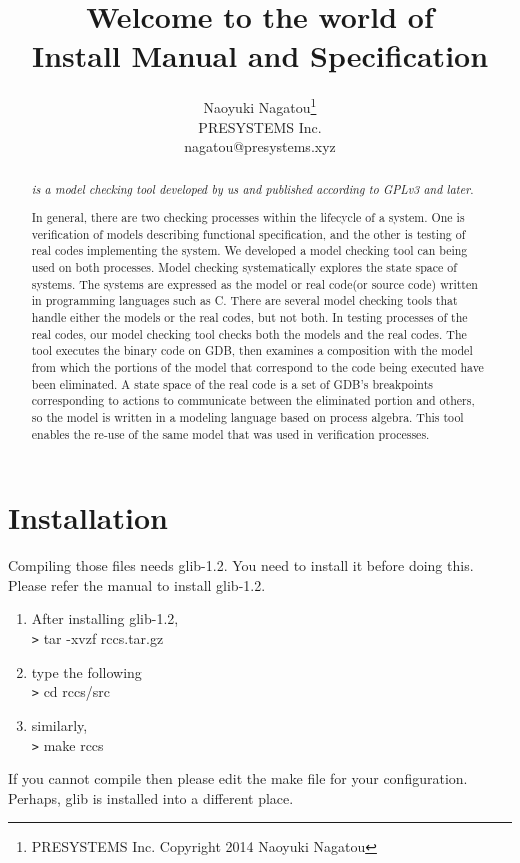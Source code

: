 \documentclass[12pt,a4paper,titlepage]{article}
\title{Welcome to the world of \NHK\\
{\small\textemdash Install Manual and Specification\textemdash}}
\author{Naoyuki Nagatou\thanks{PRESYSTEMS Inc. Copyright 2014 Naoyuki Nagatou}\\%
\small PRESYSTEMS Inc.\\[6pt]
\small nagatou@presystems.xyz}
\date{}
\theoremstyle{break}
\begin{document}
  \begin{titlepage}
\maketitle
%
%
\begin{abstract}
\NHK \emph{is a model checking tool developed by us and published according to GPLv3 and later}.

In general, there are two checking processes within the lifecycle of a system.
One is verification of models describing functional specification, 
and the other is testing of real codes implementing the system.
We developed a model checking tool can being used on both processes.
Model checking systematically explores the state space of systems.
The systems are expressed as the model
or real code(or source code) written in programming languages such as C.
There are several model checking tools 
that handle either the models or the real codes,
but not both.
In testing processes of the real codes,
our model checking tool checks both the models and the real codes.
The tool executes the binary code on GDB,
then examines a composition with the model from which the portions of 
the model that correspond to the code being executed
have been eliminated.
A state space of the real code is a set of GDB's breakpoints corresponding to
actions to communicate between the eliminated portion and others,
so the model is written in a modeling language based on process algebra.
This tool enables the re-use of the same model that was used in verification processes.
\end{abstract}
  \end{titlepage}
\tableofcontents
\newpage
\section{Installation}
  Compiling those files needs glib-1.2. You need to install it before doing this.
Please refer the manual to install glib-1.2.
  \begin{enumerate}
\item After installing glib-1.2, \\
    \verb|>| tar -xvzf rccs.tar.gz
\item type the following\\
    \verb|>| cd rccs/src
\item  similarly,\\
    \verb|>| make rccs
  \end{enumerate}
If you cannot compile then please edit the make file for your configuration.
Perhaps, glib is installed into a different place.
\end{document}
